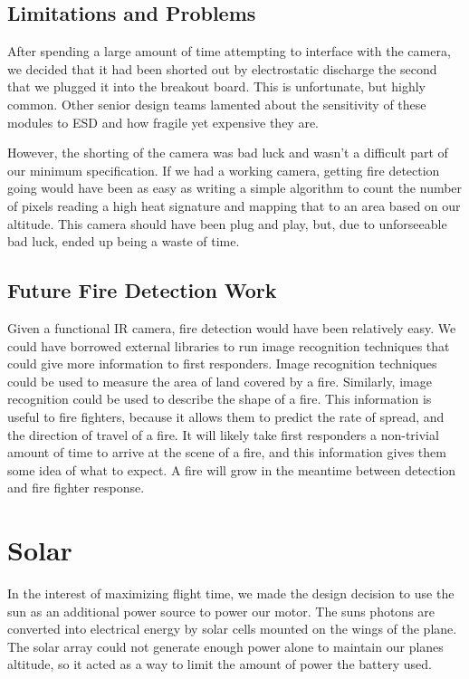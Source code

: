 \documentclass[12pt,journal,compsoc]{IEEEtran}
\begin{document}
\subsection{Limitations and Problems}
After spending a large amount of time attempting to interface with the camera, we decided that it had been shorted out by electrostatic discharge the second that we plugged it into the breakout board. This is unfortunate, but highly common. Other senior design teams lamented about the sensitivity of these modules to ESD and how fragile yet expensive they are. 

However, the shorting of the camera was bad luck and wasn't a difficult part of our minimum specification. If we had a working camera, getting fire detection going would have been as easy as writing a simple algorithm to count the number of pixels reading a high heat signature and mapping that to an area based on our altitude. This camera should have been plug and play, but, due to unforseeable bad luck, ended up being a waste of time. 

\subsection{Future Fire Detection Work}
Given a functional IR camera, fire detection would have been relatively easy. We could have borrowed external libraries to run image recognition techniques that could give more information to first responders. Image recognition techniques could be used to measure the area of land covered by a fire. Similarly, image recognition could be used to describe the shape of a fire. This information is useful to fire fighters, because it allows them to predict the rate of spread, and the direction of travel of a fire. It will likely take first responders a non-trivial amount of time to arrive at the scene of a fire, and this information gives them some idea of what to expect. A fire will grow in the meantime between detection and fire fighter response. 

\section{Solar}
In the interest of maximizing flight time, we made the design decision to use the sun as an additional power source to power our motor. The suns photons are converted into electrical energy by solar cells mounted on the wings of the plane. The solar array could not generate enough power alone to maintain our planes altitude, so it acted as a way to limit the amount of power the battery used. 
\end{document}
